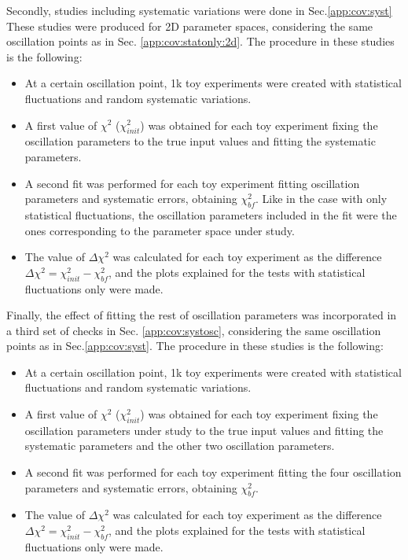 Secondly, studies including systematic variations were done  in Sec.\ref{app:cov:syst}
These studies were produced for 2D parameter spaces, considering the same oscillation points as in Sec. \ref{app:cov:statonly:2d}. The procedure in these studies is the following:

\begin{itemize}
\item{At a certain oscillation point, 1k toy experiments were created with statistical fluctuations and random systematic variations.}
\item{A first value of $\chi^{2}$ ($\chi^{2} _{init}$) was obtained for each toy experiment fixing the oscillation parameters to the true input values and fitting the systematic parameters.}
\item{A second fit was performed for each toy experiment fitting oscillation parameters and systematic errors, obtaining $\chi^{2} _{bf}$. Like in the case with only statistical fluctuations, the oscillation parameters included in the fit were the ones corresponding to the parameter space under study.}
\item{The value of $\Delta\chi^{2}$ was calculated for each toy experiment as the difference  $\Delta\chi^{2} = \chi^{2}_{init} - \chi^{2}_{bf}$, and the plots explained for the tests with statistical fluctuations only were made.}
\end{itemize}

Finally, the effect of fitting the rest of oscillation parameters was incorporated in a third set of checks in Sec. \ref{app:cov:systosc}, considering the same oscillation points as in Sec.\ref{app:cov:syst}. The procedure in these studies is the following:

\begin{itemize}
\item{At a certain oscillation point, 1k toy experiments were created with statistical fluctuations and random systematic variations.}
\item{A first value of $\chi^{2}$ ($\chi^{2} _{init}$) was obtained for each toy experiment fixing the oscillation parameters under study to the true input values and fitting the systematic parameters and the other two oscillation parameters.}
\item{A second fit was performed for each toy experiment fitting the four oscillation parameters and systematic errors, obtaining $\chi^{2} _{bf}$.}
\item{The value of $\Delta\chi^{2}$ was calculated for each toy experiment as the difference $\Delta\chi^{2} = \chi^{2}_{init} - \chi^{2}_{bf}$, and the plots explained for the tests with statistical fluctuations only were made.}
\end{itemize}

